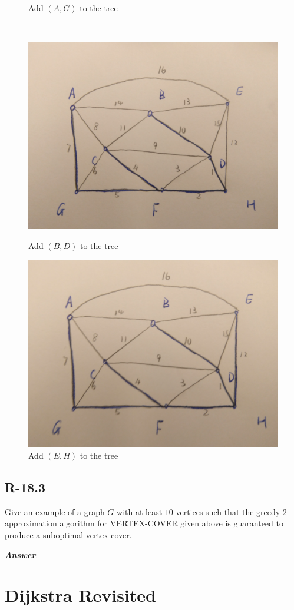 \documentclass[11pt]{article}
\begin{document}
\begin{figure}[!h]
\begin{minipage}[t]{0.50\linewidth}
		\caption{Add $(A,G)$ to the tree}
		\label{fig:subfig1:f}
	\end{minipage}
\\
	\begin{minipage}[t]{0.50\linewidth}
		\centering
		\includegraphics[width=0.75\linewidth]{Figure/1a7.jpg}
		\caption{Add $(B,D)$ to the tree}
		\label{fig:subfig1:g}
	\end{minipage}
	\begin{minipage}[t]{0.50\linewidth}
		\centering
		\includegraphics[width=0.75\linewidth]{Figure/1a8.jpg}
		\caption{Add $(E,H)$ to the tree}
		\label{fig:subfig1:h}
	\end{minipage}
\end{figure}
\subsection{R-18.3}
Give an example of a graph $G$ with at least $10$ vertices such that the greedy 2-approximation algorithm for VERTEX-COVER given above is guaranteed to produce a suboptimal vertex cover.

\noindent \textbf{\emph{Answer}}:
\section{Dijkstra Revisited}
\end{document}
